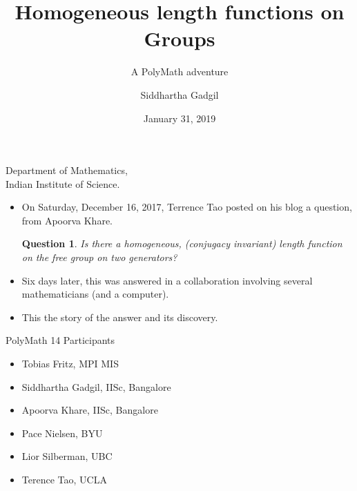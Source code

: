 \documentclass[aspectratio=1610,17pt, ucs]{beamer}
\newtheorem{question}{Question}
\begin{document}

\title{Homogeneous length functions on Groups}
\subtitle{A PolyMath adventure}
\author[Siddhartha Gadgil]{
Siddhartha Gadgil
}
\institute
{
  Department of Mathematics,\\
  Indian Institute of Science.
}


\date{January 31, 2019}
\maketitle





\begin{frame}
  \begin{itemize}[<+->]
    \item On Saturday, December 16, 2017, Terrence Tao posted on his blog a question, from Apoorva Khare.

\begin{question}
    Is there a homogeneous, (conjugacy invariant) length function on the free group on two generators?
\end{question}

    \item Six days later, this was answered in a collaboration involving several mathematicians (and a computer).
    \item This the story of the answer and its discovery.
  \end{itemize}

\end{frame}

\begin{frame}{PolyMath 14 Participants}
  \begin{itemize}
    \item Tobias Fritz, MPI MIS
    \item Siddhartha Gadgil, IISc, Bangalore
    \item Apoorva Khare, IISc, Bangalore
    \item	Pace Nielsen, BYU
    \item Lior Silberman, UBC
    \item Terence Tao, UCLA
  \end{itemize}

\end{frame}
\end{document}
